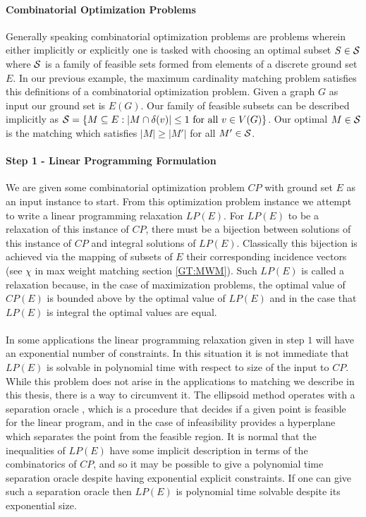 \paragraph{Combinatorial Optimization Problems}
Generally speaking combinatorial optimization problems are problems wherein either implicitly or explicitly one is tasked with choosing an optimal subset $S \in \mathcal{S}$ where $\mathcal{S}$ is a family of feasible sets formed from elements of a discrete ground set $E$. In our previous example, the maximum cardinality matching problem satisfies this definitions of a combinatorial optimization problem. Given a graph $G$ as input our ground set is $E(G)$. Our family of feasible subsets can be described implicitly as $\mathcal{S} = \{M \subseteq E: |M \cap \delta(v)| \leq 1 \text{ for all } v\in V(G)\}$. Our optimal $M \in \mathcal{S}$ is the matching which satisfies $|M| \geq |M'|$ for all $M' \in \mathcal{S}$.
\paragraph{Step 1 - Linear Programming Formulation}
We are given some combinatorial optimization  problem $CP$ with ground set $E$ as an input instance to start. From this optimization problem instance we attempt to write a linear programming relaxation $LP(E)$. For $LP(E)$ to be a relaxation of this instance of $CP$, there must be a bijection between solutions of this instance of $CP$ and integral solutions of $LP(E)$. Classically this bijection is achieved via the mapping of subsets of $E$ their corresponding incidence vectors (see $\chi$ in max weight matching section \ref{GT:MWM}). Such $LP(E)$ is called a relaxation because, in the case of maximization problems, the optimal value of $CP(E)$ is bounded above by the optimal value of $LP(E)$ and in the case that $LP(E)$ is integral the optimal values are equal.
\paragraph{}
In some applications the linear programming relaxation given in step $1$ will have an exponential number of constraints. In this situation it is not immediate that $LP(E)$ is solvable in polynomial time with respect to size of the input to $CP$. While this problem does not arise in the applications to matching we describe in this thesis, there is a way to circumvent it. The ellipsoid method operates with a separation oracle \cite{grotschel1981ellipsoid}, which is a procedure that decides if a given point is feasible for the linear program, and in the case of infeasibility provides a hyperplane which separates the point from the feasible region. It is normal that the inequalities of $LP(E)$ have some implicit description in terms of the combinatorics of $CP$, and so it may be possible to give a polynomial time separation oracle despite having exponential explicit constraints. If one can give such a separation oracle then $LP(E)$ is polynomial time solvable despite its exponential size.
